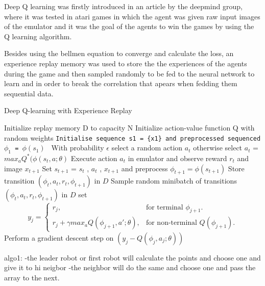\documentclass[12pt]{extarticle}
\begin{document}
Deep Q learning was firstly introduced in an article by the deepmind group, where it was tested in atari games in which the agent was given raw input images of the emulator and it was the  goal of the agents to win the games by using the Q learning algorithm.

Besides using the bellmen equation to converge and calculate the loss, an experience replay memory was used to store the the experiences of the agents during  the game and then sampled randomly to be  fed to the neural network to learn and in order to break the correlation that apears when fedding them sequential data.\cite{mnih2013playing}
 
\begin{algorithm}
\caption{Deep Q-learning with Experience Replay}\label{alg:cap}
\begin{algorithmic}
\State Initialize replay memory D to capacity N
\State Initialize action-value function Q with random weights
        \State \texttt{Initialise sequence s1 = \{x1\} and preprocessed sequenced $\phi_{1}$ = $\phi(s_{1})$  }
         \State With probability $\epsilon$ select a random action $a_{t}$
         \State otherwise select  $a_{t}$ = $max_{a} Q^{*}(\phi(s_{t},a;\theta) $ 
         \State Execute action $a_{t}$ in emulator and observe reward ${r_{t}}$ and image $x_{t+1}$
        \State Set $s_{t+1}$ = $s_{t}$ , $a_{t}$ , $x_{t+1}$ and preprocess  
        $\phi_{t+1}=\phi(s_{t+1})$
        \State Store transition $(\phi_{t} , a_{t} , r_{t} , \phi_{t+1} )$ in $D$
        \State Sample random
minibatch of transitions $(\phi_{t} , a_{t} , r_{t} , \phi_{t+1} )$ in $D$
        \State set  \begin{equation}
  y_{j}=\begin{cases}
    r_{j}, & \text{for terminal $\phi_{j+1} $}.\\
    r_{j}+\gamma max_{a}Q(\phi_{j+1},a';\theta) , & \text{for non-terminal $Q(\phi_{j+1})$}.
  \end{cases}
\end{equation}
        \State Perform a gradient descent step on $(y_{j} - Q(\phi_{j} , a_{j} ; \theta))$ 
        \EndFor 
\EndFor 


\end{algorithmic}
\end{algorithm}
 

 
 
algo1:
  -the leader robot or first robot will calculate the points and choose one
  and give it to hi neigbor
  -the neighbor will do the same and choose one and pass the array to the next.
  
\end{document}
